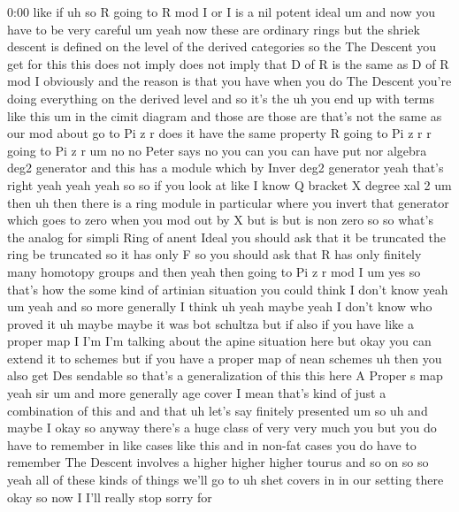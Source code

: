 \begin{unfinished}{0:00}
like  if  uh  so  R  going  to  R  mod  I  or  I  is
a  nil  potent
ideal  um  and  now  you  have  to  be  very
careful
um  yeah  now  these  are  ordinary  rings  but
the  shriek  descent  is  defined  on  the
level  of  the  derived  categories  so  the
The  Descent  you  get  for  this  this  does
not
imply  does  not  imply  that  D  of  R  is  the
same  as  D  of  R  mod  I  obviously
and  the  reason  is  that  you  have  when  you
do  The  Descent  you're  doing  everything
on  the  derived  level  and  so  it's  the  uh
you  end  up  with  terms  like  this  um  in
the  cimit  diagram  and  those  are  those
are  that's  not  the  same  as  our  mod  about
go  to  Pi  z  r  does  it  have  the  same
property  R  going  to  Pi  z  r  r  going  to  Pi
z
r
um  no  no  Peter  says
no  you  can  you  can  have  put  nor  algebra
deg2
generator  and  this  has  a  module  which  by
Inver  deg2  generator  yeah  that's  right
yeah
yeah  yeah  so  so  if  you  look  at  like  I
know  Q  bracket  X  degree  xal  2  um  then
uh
then  there  is  a  ring  module  in
particular  where  you  invert  that
generator  which  goes  to  zero  when  you
mod  out  by  X  but  is  but  is  non  zero  so
so  what's  the  analog  for  simpli  Ring  of
anent  Ideal  you  should  ask  that  it  be
truncated  the  ring  be  truncated  so  it
has  only  F  so  you  should  ask  that  R  has
only  finitely  many  homotopy  groups  and
then  yeah  then  going  to  Pi  z  r  mod
I
um  yes  so  that's  how  the  some  kind  of
artinian  situation  you  could  think  I
don't  know  yeah  um  yeah  and  so  more
generally  I  think  uh  yeah  maybe  yeah  I
don't  know  who  proved  it  uh  maybe  maybe
it  was  bot  schultza  but  if  also  if  you
have  like  a  proper
map  I  I'm  I'm  talking  about  the  apine
situation  here  but  okay  you  can  extend
it  to  schemes  but  if  you  have  a  proper
map  of  nean
schemes  uh  then  you  also  get  Des
sendable  so  that's  a  generalization  of
this  this  here  A  Proper  s  map  yeah
sir  um  and  more  generally  age
cover  I  mean  that's  kind  of  just  a
combination  of  this  and  and
that  uh  let's  say  finitely
presented  um  so  uh  and  maybe  I  okay  so
anyway  there's  a  huge  class
of  very  very  much  you  but  you  do  have  to
remember  in  like  cases  like  this  and  in
non-fat  cases  you  do  have  to  remember
The  Descent  involves  a  higher  higher
higher  tourus  and  so  on  so  so  yeah  all
of  these  kinds  of  things  we'll  go  to  uh
shet  covers  in  in  our  setting  there  okay
so  now  I  I'll  really  stop  sorry  for

\end{unfinished}
